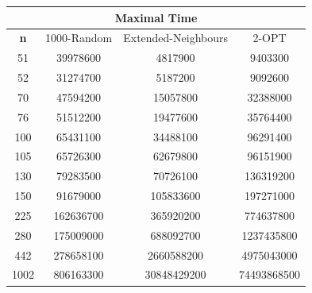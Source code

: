 \documentclass{article}
\begin{document}
\begin{center}
\begin{tabular}{|c|c|c|c|}
\hline
\multicolumn{4}{|c|}{\textbf{Maximal Time}}\\
\hline
\textbf{n} & 1000-Random & Extended-Neighbours & 2-OPT\\
\hline
51 & 39978600 & 4817900 & 9403300\\
\hline
52 & 31274700 & 5187200 & 9092600\\
\hline
70 & 47594200 & 15057800 & 32388000\\
\hline
76 & 51512200 & 19477600 & 35764400\\
\hline
100 & 65431100 & 34488100 & 96291400\\
\hline
105 & 65726300 & 62679800 & 96151900\\
\hline
130 & 79283500 & 70726100 & 136319200\\
\hline
150 & 91679000 & 105833600 & 197271000\\
\hline
225 & 162636700 & 365920200 & 774637800\\
\hline
280 & 175009000 & 688092700 & 1237435800\\
\hline
442 & 278658100 & 2660588200 & 4975043000\\
\hline
1002 & 806163300 & 30848429200 & 74493868500\\
\hline
\end{tabular}
\end{center}
\end{document}
